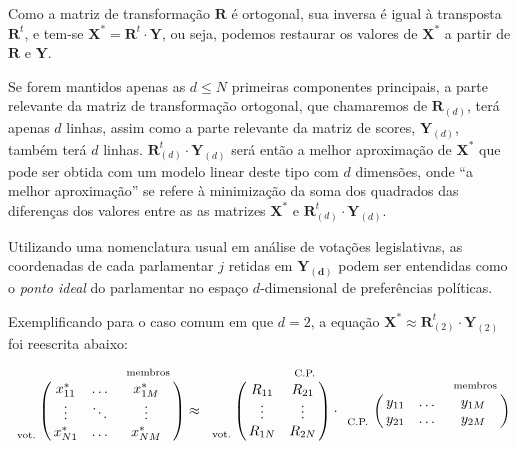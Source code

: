 \documentclass[
	article,			%
	12pt,				%
    twoside,			%
	a4paper,			%
	english,			%
	french,				%
	spanish,			%
	brazil,				%
	]{abntex2}
\let\bbordermatrix\bordermatrix
\begin{document}


Como a matriz de transformação $\mathbf{R}$ é ortogonal, sua inversa é igual à transposta $\mathbf{R}^{t}$, e tem-se $\mathbf{X^{*}} = \mathbf{R}^t \cdot \mathbf{Y}$, ou seja, podemos restaurar os valores de $\mathbf{X^{*}}$ a partir de $\mathbf{R}$ e $\mathbf{Y}$.

Se forem mantidos apenas as $d \leq N$ primeiras componentes principais, a parte relevante da matriz de transformação ortogonal, que chamaremos de $\mathbf{R}_{(d)}$, terá apenas $d$ linhas, assim como a parte relevante da matriz de scores, $\mathbf{Y}_{(d)}$, também terá $d$ linhas. $\mathbf{R}_{(d)}^{t}\cdot \mathbf{Y}_{(d)}$ será então a melhor aproximação de $\mathbf{X^{*}}$ que pode ser obtida com um modelo linear deste tipo com $d$ dimensões, onde ``a melhor aproximação'' se refere à minimização da soma dos quadrados das diferenças dos valores entre as as matrizes $\mathbf{X^*}$ e $\mathbf{R}_{(d)}^{t}\cdot \mathbf{Y}_{(d)}$. 

Utilizando uma nomenclatura usual em análise de votações legislativas, as coordenadas de cada parlamentar $j$ retidas em $\mathbf{Y_{(d)}}$ podem ser entendidas como o \emph{ponto ideal} do parlamentar no espaço $d$-dimensional de preferências políticas.

Exemplificando para o caso comum em que $d=2$, a equação $\mathbf{X^{*}} \approx \mathbf{R}_{(2)}^{t} \cdot \mathbf{Y}_{(2)}$ foi reescrita abaixo:
\[
  \bbordermatrix{~  & ~ & ~ & ~_\text{membros} \cr
                ~ & x^{*}_{11} & \ldots & x^{*}_{1M}   \cr
                ~ & \vdots & \ddots & \vdots  \cr
                ~_\text{vot.} & x^{*}_{N1} & \ldots & x^{*}_{NM}   \cr
                } \approx
  \bbordermatrix{~  & ~ & ~_\text{C.P.} \cr
                ~ & R_{11} & R_{21}   \cr
                ~ & \vdots & \vdots  \cr
                ~_\text{vot.} & R_{1N} & R_{2N} \cr
                } \cdot
  \bbordermatrix{~  & ~ & ~ & ~_\text{membros} \cr
                ~ & y_{11} & \ldots & y_{1M}   \cr
                ~_\text{C.P.} & y_{21} & \ldots & y_{2M}   \cr
                }
\]
\end{document}
